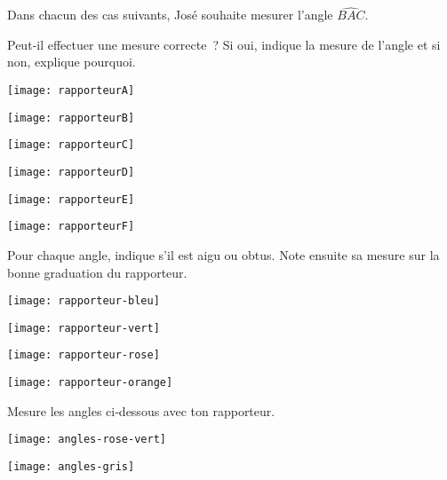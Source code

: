 \begin{exercice}
Dans chacun des cas suivants, José souhaite mesurer l'angle $\widehat{BAC}$.

Peut‑il effectuer une mesure correcte ? Si oui, indique la mesure de l'angle et si non, explique pourquoi. \\[0.5em]
\begin{colenumerate}{2}
 \item 
 
 \texttt{[image: rapporteurA]}
 \item 
 
  \vspace{-2em} \texttt{[image: rapporteurB]}
 \item 
 
 \texttt{[image: rapporteurC]}
 \item 
 
 \texttt{[image: rapporteurD]}
 \item 
 
 \texttt{[image: rapporteurE]}
 \item 
 
 \vspace{-2em} \texttt{[image: rapporteurF]}
 \end{colenumerate}
\end{exercice}  


\begin{exercice}
Pour chaque angle, indique s'il est aigu ou obtus. Note ensuite sa mesure sur la bonne graduation du rapporteur.
\begin{colenumerate}{2}
 \item  
 
 \texttt{[image: rapporteur-bleu]}
 \item 
 
 \texttt{[image: rapporteur-vert]}
 \item 
 
 \texttt{[image: rapporteur-rose]}
 \item 
 
 \texttt{[image: rapporteur-orange]}

 \end{colenumerate}
\end{exercice} 


\begin{exercice}
Mesure les angles ci‑dessous avec ton rapporteur.
 \begin{center} \texttt{[image: angles-rose-vert]} \end{center}
 
 \begin{center} \texttt{[image: angles-gris]} \end{center}
\end{exercice} 


